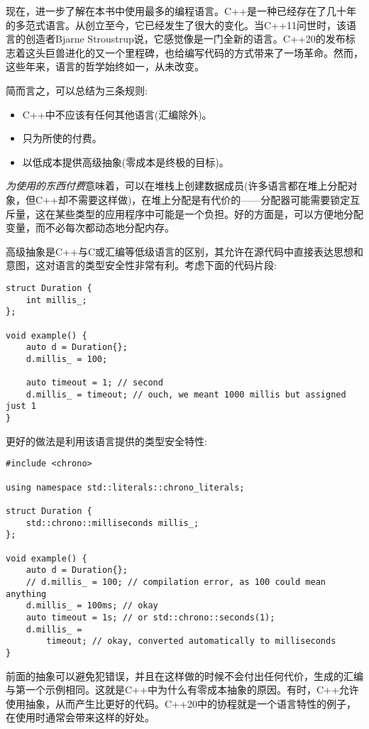 
现在，进一步了解在本书中使用最多的编程语言。C++是一种已经存在了几十年的多范式语言。从创立至今，它已经发生了很大的变化。当C++11问世时，该语言的创造者Bjarne Stroustrup说，它感觉像是一门全新的语言。C++20的发布标志着这头巨兽进化的又一个里程碑，也给编写代码的方式带来了一场革命。然而，这些年来，语言的哲学始终如一，从未改变。

简而言之，可以总结为三条规则:

\begin{itemize}
\item C++中不应该有任何其他语言(汇编除外)。
\item 只为所使的付费。
\item 以低成本提供高级抽象(零成本是终极的目标)。
\end{itemize}

\textit{为使用的东西付费}意味着，可以在堆栈上创建数据成员(许多语言都在堆上分配对象，但C++却不需要这样做)，在堆上分配是有代价的——分配器可能需要锁定互斥量，这在某些类型的应用程序中可能是一个负担。好的方面是，可以方便地分配变量，而不必每次都动态地分配内存。

高级抽象是C++与C或汇编等低级语言的区别，其允许在源代码中直接表达思想和意图，这对语言的类型安全性非常有利。考虑下面的代码片段:


\begin{lstlisting}[style=styleCXX]
struct Duration {
	int millis_;
};

void example() {
	auto d = Duration{};
	d.millis_ = 100;
	
	auto timeout = 1; // second
	d.millis_ = timeout; // ouch, we meant 1000 millis but assigned just 1
}

\end{lstlisting}

更好的做法是利用该语言提供的类型安全特性:

\begin{lstlisting}[style=styleCXX]
#include <chrono>

using namespace std::literals::chrono_literals;

struct Duration {
	std::chrono::milliseconds millis_;
};

void example() {
	auto d = Duration{};
	// d.millis_ = 100; // compilation error, as 100 could mean anything
	d.millis_ = 100ms; // okay
	auto timeout = 1s; // or std::chrono::seconds(1);
	d.millis_ =
		timeout; // okay, converted automatically to milliseconds
}
\end{lstlisting}

前面的抽象可以避免犯错误，并且在这样做的时候不会付出任何代价，生成的汇编与第一个示例相同。这就是C++中为什么有零成本抽象的原因。有时，C++允许使用抽象，从而产生比更好的代码。C++20中的协程就是一个语言特性的例子，在使用时通常会带来这样的好处。

